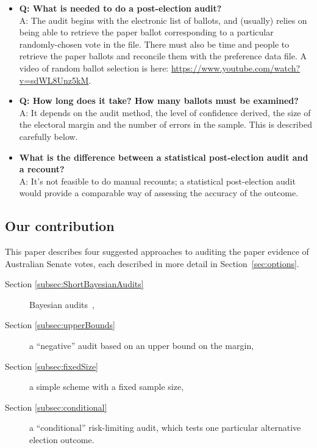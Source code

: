 \documentclass[10pt,a4paper]{article}
\begin{document}
\begin{itemize}
\item {\bf Q: What is needed to do a post-election audit?} \\
    A: The audit begins with the electronic list of ballots, and (usually) relies on being able to retrieve the paper ballot corresponding to a particular randomly-chosen vote in the file.  There must also be  time and people to retrieve the paper ballots and reconcile them with the preference data file.  A video of random ballot selection is here: \url{https://www.youtube.com/watch?v=sdWL8Unz5kM}.
\item {\bf Q: How long does it take?  How many ballots must be examined?} \\ A: It depends on the audit method, the level of confidence derived, the size of the electoral margin and the number of errors in the sample.  This is described carefully below.    
\item {\bf What is the difference between a statistical post-election audit and a recount?} \\ A: It's not feasible to do manual recounts; a statistical post-election audit would provide a comparable way of assessing the accuracy of the  outcome.
\end{itemize}


\subsection{Our contribution}
This paper describes four suggested approaches to auditing the paper evidence of Australian Senate votes, each described in more detail in Section~\ref{sec:options}.  
\begin{description}
	\item[Section \ref{subsec:ShortBayesianAudits}] Bayesian audits~\cite{rivest2012bayesian},
	\item[Section \ref{subsec:upperBounds}] a ``negative'' audit based on an upper bound on the margin, 
	\item[Section \ref{subsec:fixedSize}] a simple scheme with a fixed sample size,  
	\item[Section \ref{subsec:conditional}] a ``conditional'' risk-limiting audit, which tests one particular alternative election outcome.

\end{description}
\end{document}
